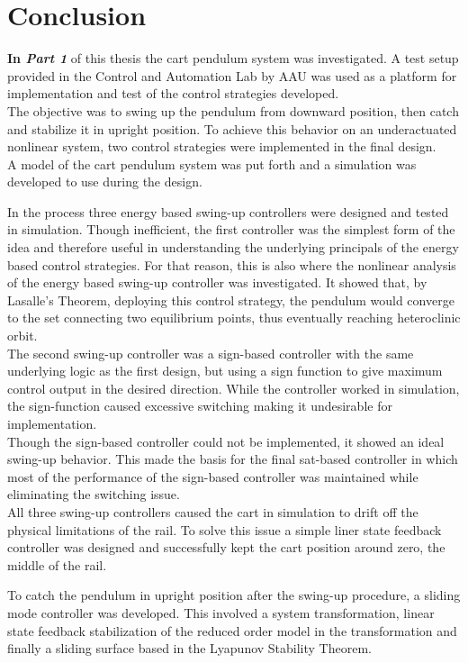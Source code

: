 %
\chapter{Conclusion}
\textbf{In \textit{Part 1}} of this thesis the cart pendulum system was investigated. A test setup provided in the Control and Automation Lab by AAU was used as a platform for implementation and test of the control strategies developed.\\
The objective was to swing up the pendulum from downward position, then catch and stabilize it in upright position. To achieve this behavior on an underactuated nonlinear system, two control strategies were implemented in the final design.\\
A model of the cart pendulum system was put forth and a simulation was developed to use during the design.

In the process three energy based swing-up controllers were designed and tested in simulation. Though inefficient, the first controller was the simplest form of the idea and therefore useful in understanding the underlying principals of the energy based control strategies. For that reason, this is also where the nonlinear analysis of the energy based swing-up controller was investigated. It showed that, by Lasalle's Theorem, deploying this control strategy, the pendulum would converge to the set connecting two equilibrium points, thus eventually reaching heteroclinic orbit.\\
The second swing-up controller was a sign-based controller with the same underlying logic as the first design, but using a sign function to give maximum control output in the desired direction. While the controller worked in simulation, the sign-function caused excessive switching making it undesirable for implementation.\\
Though the sign-based controller could not be implemented, it showed an ideal swing-up behavior. This made the basis for the final sat-based controller in which most of the performance of the sign-based controller was maintained while eliminating the switching issue.\\
All three swing-up controllers caused the cart in simulation to drift off the physical limitations of the rail. To solve this issue a simple liner state feedback controller was designed and successfully kept the cart position around zero, the middle of the rail.

To catch the pendulum in upright position after the swing-up procedure, a sliding mode controller was developed. This involved a system transformation, linear state feedback stabilization of the reduced order model in the transformation and finally a sliding surface based in the Lyapunov Stability Theorem.

